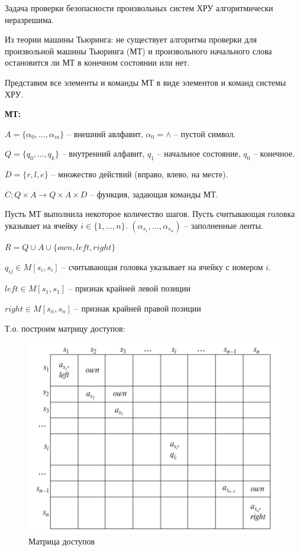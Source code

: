 \begin{proofs}
	Задача проверки безопасности произвольных систем ХРУ алгоритмически неразрешима.
	\begin{dokvo}
		Из теории машины Тьюринга: не существует алгоритма проверки для произвольной машины Тьюринга (МТ) и произвольного начального слова остановится ли МТ в конечном состоянии или нет.

		Представим все элементы и команды МТ в виде элементов и команд системы ХРУ.

		\textbf{МТ:}

		$ A = \{ \alpha_0, \ldots, \alpha_m \} $ -- внешний авлфавит, $ \alpha_0 = \wedge $ -- пустой символ.

		$ Q = \{ q_0, \ldots, q_k \} $ -- внутренний алфавит, $q_1$ -- начальное состояние, $q_0$ -- конечное.

		$ D = \{ r, l, e \} $ -- множество действий (вправо, влево, на месте).

		$ C: Q \times A \to Q \times A \times D $ -- функция, задающая команды МТ.

		Пусть МТ выполнила некоторое количество шагов. Пусть считывающая головка указывает на ячейку $ i \in \{ 1, \ldots , n \} $. $ (\alpha_{s_{1}}, \ldots, \alpha_{s_{n}}) $ -- заполненные ленты.

		$ R = Q \cup A \cup \{own, left, right \} $

		$ q_{ij} \in M[s_i, s_i] $ -- считывающая головка указывает на ячейку с номером $i$.

		$left \in M[s_1, s_1]$ -- признак крайней левой позиции

		$right \in M[s_n, s_n]$ -- признак крайней правой позиции

		Т.о. построим матрицу доступов:

		\begin{figure}[H]
			\centering
			\includegraphics[width=0.5\linewidth]{img/2.png}
			\caption{Матрица доступов}
		\end{figure}


\end{dokvo}
\end{proofs}
